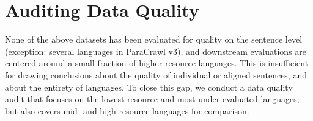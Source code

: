 \section{Auditing Data Quality}\label{sec:audit}
None of the above datasets has been evaluated for quality on the sentence level (exception: several languages in ParaCrawl v3), and downstream evaluations are centered around a small fraction of higher-resource languages. This is insufficient for drawing conclusions about the quality of individual or aligned sentences, and about the entirety of languages. %
To close this gap, we conduct a data quality audit that focuses on the lowest-resource and most under-evaluated languages, but also covers mid- and high-resource languages for comparison. %



